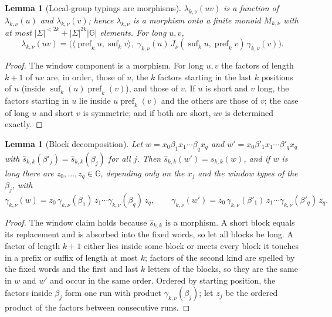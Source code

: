 \documentclass[11pt]{article}
\numberwithin{equation}{section}
\theoremstyle{plain}
\newtheorem{lemma}[theorem]{Lemma}
\theoremstyle{definition}
\theoremstyle{remark}
\begin{document}
\begin{lemma}[Local-group typings are morphisms]
\label{lem:local-group-morphism}
$\lambda_{k,\nu}(uv)$ is a function of $\lambda_{k,\nu}(u)$ and $\lambda_{k,\nu}(v)$;
hence $\lambda_{k,\nu}$ is a morphism onto a finite monoid $M_{k,\nu}$ with at most
$|\Sigma|^{<2k}+|\Sigma|^{2k}|{\mathbb G}|$ elements.  For long $u,v$,
\[
 \lambda_{k,\nu}(uv)
 =\bigl(\langle\operatorname{pref}_ku,\operatorname{suf}_kv\rangle,\;
   \gamma_{k,\nu}(u)\,J_\nu(\operatorname{suf}_ku,\operatorname{pref}_kv)\,
   \gamma_{k,\nu}(v)\bigr).
\]
\end{lemma}

\begin{proof}
The window component is a morphism.  For long $u,v$ the factors of length $k+1$
of $uv$ are, in order, those of $u$, the $k$ factors starting in the last $k$
positions of $u$ (inside $\operatorname{suf}_k(u)\operatorname{pref}_k(v)$), and
those of $v$.  If $u$ is short and $v$ long, the factors starting in $u$ lie inside
$u\operatorname{pref}_k(v)$ and the others are those of $v$; the case of long $u$ and
short $v$ is symmetric; and if both are short, $uv$ is determined exactly.
\end{proof}

\begin{lemma}[Block decomposition]
\label{lem:local-group-blocks}
Let $w=x_0\beta_1x_1\cdots\beta_qx_q$ and $w'=x_0\beta'_1x_1\cdots\beta'_qx_q$ with
$\widehat s_{k,k}(\beta'_j)=\widehat s_{k,k}(\beta_j)$ for all $j$.  Then
$\widehat s_{k,k}(w')=\widehat s_{k,k}(w)$, and if $w$ is long there are
$z_0,\ldots,z_q\in {\mathbb G}$, depending only on the $x_j$ and the window types of the
$\beta_j$, with
\[
 \gamma_{k,\nu}(w)=z_0\,\gamma_{k,\nu}(\beta_1)\,z_1\cdots\gamma_{k,\nu}(\beta_q)\,z_q,
 \qquad
 \gamma_{k,\nu}(w')=z_0\,\gamma_{k,\nu}(\beta'_1)\,z_1\cdots\gamma_{k,\nu}(\beta'_q)\,z_q .
\]
\end{lemma}

\begin{proof}
The window claim holds because $\widehat s_{k,k}$ is a morphism.  A short block equals
its replacement and is absorbed into the fixed words, so let all blocks be long.  A
factor of length $k+1$ either lies inside some block or meets every block it touches
in a prefix or suffix of length at most $k$; factors of the second kind are spelled by
the fixed words and the first and last $k$ letters of the blocks, so they are the same
in $w$ and $w'$ and occur in the same order.  Ordered by starting position, the
factors inside $\beta_j$ form one run with product $\gamma_{k,\nu}(\beta_j)$; let
$z_j$ be the ordered product of the factors between consecutive runs.
\end{proof}
\end{document}
